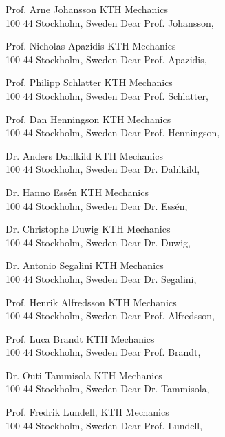 %
%
%
%
Prof. Arne Johansson
KTH Mechanics\\100 44 Stockholm, Sweden
Dear Prof. Johansson,

Prof. Nicholas Apazidis
KTH Mechanics\\100 44 Stockholm, Sweden
Dear Prof. Apazidis,

Prof. Philipp Schlatter
KTH Mechanics\\100 44 Stockholm, Sweden
Dear Prof. Schlatter,

Prof. Dan Henningson
KTH Mechanics\\100 44 Stockholm, Sweden
Dear Prof. Henningson,

Dr. Anders Dahlkild
KTH Mechanics\\100 44 Stockholm, Sweden
Dear Dr. Dahlkild,

Dr. Hanno Essén
KTH Mechanics\\100 44 Stockholm, Sweden
Dear Dr. Essén,

Dr. Christophe Duwig
KTH Mechanics\\100 44 Stockholm, Sweden
Dear Dr. Duwig,

Dr. Antonio Segalini
KTH Mechanics\\100 44 Stockholm, Sweden
Dear Dr. Segalini,

Prof. Henrik Alfredsson
KTH Mechanics\\100 44 Stockholm, Sweden
Dear Prof. Alfredsson,

Prof. Luca Brandt
KTH Mechanics\\100 44 Stockholm, Sweden
Dear Prof. Brandt,

Dr. Outi Tammisola
KTH Mechanics\\100 44 Stockholm, Sweden
Dear Dr. Tammisola,

Prof. Fredrik Lundell,
KTH Mechanics\\100 44 Stockholm, Sweden
Dear Prof. Lundell,


%


